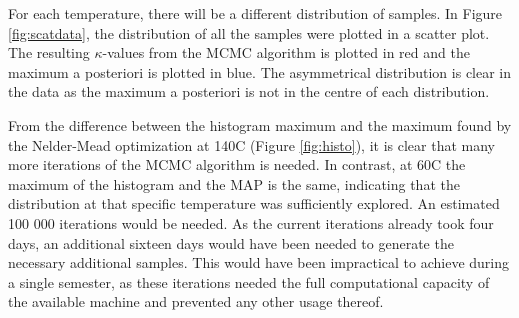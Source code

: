  For each temperature, there will be a different distribution of samples. 
 In Figure \ref{fig:scatdata}, the distribution of all the samples were plotted in a scatter plot.
 The resulting $\kappa$-values from the MCMC algorithm is plotted in red and the maximum a posteriori is plotted in blue.
 The asymmetrical distribution  is clear in the data as the maximum a posteriori is not in the centre of each distribution.

From the difference between the histogram maximum and the maximum found by the Nelder-Mead optimization at 140\textdegree C (Figure \ref{fig:histo}), it is clear that many more iterations of the MCMC algorithm is needed.
In contrast, at 60\textdegree C the maximum of the histogram and the MAP is the same, indicating that the distribution at that specific temperature was sufficiently explored.
An estimated 100 000 iterations would be needed.
As the current iterations already took four days, an additional sixteen days would have been needed to generate the necessary additional samples.
This would have been impractical to achieve during a single semester, as these iterations needed the full computational capacity of the available machine and prevented any other usage thereof.

